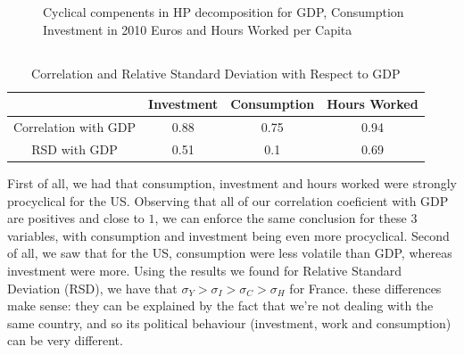 \documentclass[12pt]{article}
\begin{document}
\begin{figure}[h]
    \centering
    \hspace{-20pt}
    \caption{Cyclical compenents in HP decomposition for GDP, Consumption Investment in 2010 Euros and Hours Worked per Capita}
    \label{fig:cycles}
\end{figure}


\subsection{}
\begin{table}[h]
  \centering
  \begin{tabular}{|c|c|c|c|}
      \hline
      & Investment & Consumption & Hours Worked \\
      \hline
      Correlation with GDP & 0.88 & 0.75 & 0.94 \\
      \hline
      RSD with GDP & 0.51 & 0.1 & 0.69 \\
      \hline
  \end{tabular}
  \caption{Correlation and Relative Standard Deviation with Respect to GDP}
\end{table}

First of all, we had that consumption, investment and hours worked were strongly procyclical for the US. 
Observing that all of our correlation coeficient with GDP are positives and close to $1$, we can enforce the same conclusion for these $3$ variables, with consumption and investment being even more procyclical.
\newline    
Second of all, we saw that for the US, consumption were less volatile than GDP, whereas investment were more.
Using the results we found for Relative Standard Deviation (RSD), we have that $\sigma_Y > \sigma_I > \sigma_C > \sigma_H$ for France. these differences make sense: they can be explained by the fact that we're not dealing with the same country, and so its political behaviour (investment, work and consumption) can be very different.
\end{document}
